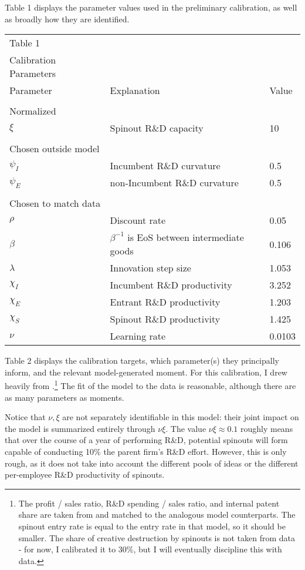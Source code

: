 \documentclass[12pt,english]{article}
\theoremstyle{remark}
\begin{document}
Table 1 displays the parameter values used in the preliminary calibration, as well as broadly how they are identified.

\begin{table}[h]
	\centering{}%
	\begin{tabular}{lll}
		Table 1 &  &  \tabularnewline
		Calibration Parameters &  &  \tabularnewline
		\hline 
		Parameter & Explanation & Value\tabularnewline
		\tabularnewline
		\hline 
		Normalized & & \tabularnewline
		$\xi$ & Spinout R\&D capacity & 10 \tabularnewline
		&  & \tabularnewline
		Chosen outside model & & \tabularnewline
		$\psi_I$ & Incumbent R\&D curvature & 0.5\tabularnewline
		$\psi_E$ & non-Incumbent R\&D curvature & 0.5\tabularnewline
		&  & \tabularnewline
		Chosen to match data & & \tabularnewline
		$\rho$ & Discount rate & 0.05\tabularnewline
		$\beta$ & $\beta^{-1}$ is EoS between intermediate goods & 0.106\tabularnewline
		$\lambda$ & Innovation step size & 1.053\tabularnewline
		$\chi_I$ & Incumbent R\&D productivity & 3.252\tabularnewline
		$\chi_E$ & Entrant R\&D productivity & 1.203\tabularnewline
		$\chi_S$ & Spinout R\&D productivity & 1.425\tabularnewline
		$\nu$ & Learning rate & 0.0103
	\end{tabular}
\end{table}

Table 2 displays the calibration targets, which parameter(s) they principally inform, and the relevant model-generated moment. For this calibration, I drew heavily from \cite{akcigit_growth_2018}.\footnote{The profit / sales ratio, R\&D spending / sales ratio, and internal patent share are taken from \cite{akcigit_growth_2018} and matched to the analogous model counterparts. The spinout entry rate is equal to the entry rate in that model, so it should be smaller. The share of creative destruction by spinouts is not taken from data - for now, I calibrated it to 30\%, but I will eventually discipline this with data.} The fit of the model to the data is reasonable, although there are as many parameters as moments.

Notice that $\nu,\xi$ are not separately identifiable in this model: their joint impact on the model is summarized entirely through $\nu \xi$. The value $\nu \xi \approx 0.1$ roughly means that over the course of a year of performing R\&D, potential spinouts will form capable of conducting 10\% the parent firm's R\&D effort. However, this is only rough, as it does not take into account the different pools of ideas or the different per-employee R\&D productivity of spinouts. 
\end{document}
